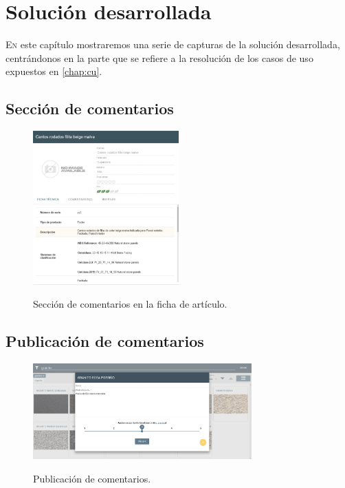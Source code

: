 \chapter{Solución desarrollada}

\lettrine{E}{n} este capítulo mostraremos una serie de capturas de la solución desarrollada, centrándonos en la parte que se refiere a la resolución de los casos de uso expuestos en \ref{chap:cu}.

\section{Sección de comentarios}

\begin{figure}[H]
	\centering
	\includegraphics[width=0.5\textwidth]{imaxes/sectComment.png}
	\label{seccom}
	\caption{Sección de comentarios en la ficha de artículo.}
\end{figure}


\section{Publicación de comentarios}

\begin{figure}[H]
	\centering
	\includegraphics[width=0.75\textwidth]{imaxes/publicComment.png}
	\label{pubcom}
	\caption{Publicación de comentarios.}
\end{figure}

